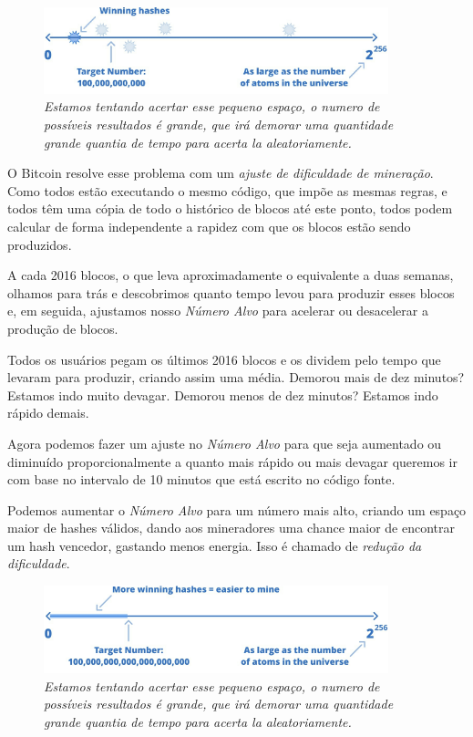 \begin{figure}
  \centering
  \includegraphics[width=10cm]{imagens/capitulo5/difficulty1.png}
  
  \caption*{\textit{Estamos tentando acertar esse pequeno espaço, o numero de possíveis resultados é grande, que irá demorar uma quantidade grande quantia de tempo para acerta la aleatoriamente.}}
\end{figure}

O Bitcoin resolve esse problema com um \textit{ajuste de dificuldade de mineração}. Como todos estão executando o mesmo código, que impõe as mesmas regras, e todos têm uma cópia de todo o histórico de blocos até este ponto, todos podem calcular de forma independente a rapidez com que os blocos estão sendo produzidos.

A cada 2016 blocos, o que leva aproximadamente o equivalente a duas semanas, olhamos para trás e descobrimos quanto tempo levou para produzir esses blocos e, em seguida, ajustamos nosso \textit{Número Alvo} para acelerar ou desacelerar a produção de blocos.

Todos os usuários pegam os últimos 2016 blocos e os dividem pelo tempo que levaram para produzir, criando assim uma média. Demorou mais de dez minutos? Estamos indo muito devagar. Demorou menos de dez minutos? Estamos indo rápido demais.

Agora podemos fazer um ajuste no \textit{Número Alvo} para que seja aumentado ou diminuído proporcionalmente a quanto mais rápido ou mais devagar queremos ir com base no intervalo de 10 minutos que está escrito no código fonte.

Podemos aumentar o \textit{Número Alvo} para um número mais alto, criando um espaço maior de hashes válidos, dando aos mineradores uma chance maior de encontrar um hash vencedor, gastando menos energia. Isso é chamado de \textit{redução da dificuldade}.

\begin{figure}
  \centering
  \includegraphics[width=10cm]{imagens/capitulo5/difficulty2.png}
  \caption*{\textit{Estamos tentando acertar esse pequeno espaço, o numero de possíveis resultados é grande, que irá demorar uma quantidade grande quantia de tempo para acerta la aleatoriamente.}}
\end{figure}

